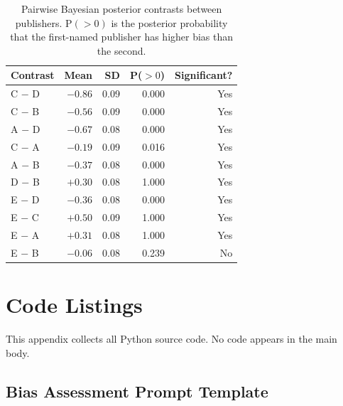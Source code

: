 \documentclass[10pt,letterpaper]{article}
\begin{document}
\begin{table}[h]
\centering
\caption{Pairwise Bayesian posterior contrasts between publishers.
$\mathrm{P}(> 0)$ is the posterior probability that the first-named publisher
has higher bias than the second.}
\label{tab:contrasts}
\begin{tabular}{lrrrr}
\toprule
\textbf{Contrast} & \textbf{Mean} & \textbf{SD} & \textbf{P($>0$)} & \textbf{Significant?} \\
\midrule
C $-$ D & $-0.86$ & 0.09 & 0.000 & Yes \\
C $-$ B & $-0.56$ & 0.09 & 0.000 & Yes \\
A $-$ D & $-0.67$ & 0.08 & 0.000 & Yes \\
C $-$ A & $-0.19$ & 0.09 & 0.016 & Yes \\
A $-$ B & $-0.37$ & 0.08 & 0.000 & Yes \\
D $-$ B & $+0.30$ & 0.08 & 1.000 & Yes \\
E $-$ D & $-0.36$ & 0.08 & 0.000 & Yes \\
E $-$ C & $+0.50$ & 0.09 & 1.000 & Yes \\
E $-$ A & $+0.31$ & 0.08 & 1.000 & Yes \\
E $-$ B & $-0.06$ & 0.08 & 0.239 & No  \\
\bottomrule
\end{tabular}
\end{table}

\section{Code Listings}
\label{app:code}

This appendix collects all Python source code.  No code appears in the main body.

\subsection*{Bias Assessment Prompt Template}
\end{document}
